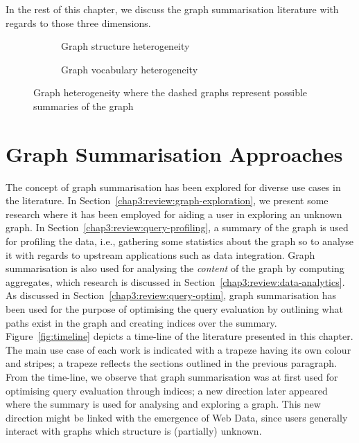 In the rest of this chapter, we discuss the graph summarisation literature with regards to those three dimensions.

\begin{figure}
	\centering
	\begin{subfigure}{.5\textwidth}
		\resizebox{\textwidth}{!}{
			
		}
		\caption{Graph structure heterogeneity}
		\label{fig:hetero-struct}
	\end{subfigure}
	\qquad
	\begin{subfigure}{.42\textwidth}
		\resizebox{\textwidth}{!}{
			
		}
		\caption{Graph vocabulary heterogeneity}
		\label{fig:hetero-voc}
	\end{subfigure}
	\caption{Graph heterogeneity where the dashed graphs represent possible summaries of the graph}
	\label{fig:graph-hetero}
\end{figure}

\section{Graph Summarisation Approaches}

The concept of graph summarisation has been explored for diverse use cases in the literature. In Section~\ref{chap3:review:graph-exploration}, we present some research where it has been employed for aiding a user in exploring an unknown graph. In Section~\ref{chap3:review:query-profiling}, a summary of the graph is used for profiling the data, i.e., gathering some statistics about the graph so to analyse it with regards to upstream applications such as data integration. Graph summarisation is also used for analysing the \emph{content} of the graph by computing aggregates, which research is discussed in Section~\ref{chap3:review:data-analytics}. As discussed in Section~\ref{chap3:review:query-optim}, graph summarisation has been used for the purpose of optimising the query evaluation by outlining what paths exist in the graph and creating indices over the summary.\\

Figure~\ref{fig:timeline} depicts a time-line of the literature presented in this chapter. The main use case of each work is indicated with a trapeze having its own colour and stripes; a trapeze reflects the sections outlined in the previous paragraph. From the time-line, we observe that graph summarisation was at first used for optimising query evaluation through indices; a new direction later appeared where the summary is used for analysing and exploring a graph. This new direction might be linked with the emergence of Web Data, since users generally interact with graphs which structure is (partially) unknown.

